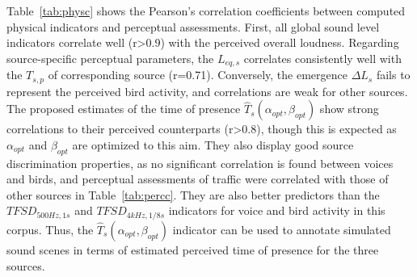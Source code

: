 \documentclass[twocolumn]{article}
\begin{document}
Table~\ref{tab:physc} shows the Pearson's correlation coefficients between computed physical indicators and perceptual assessments. First, all global sound level indicators correlate well (r>0.9) with the perceived overall loudness. Regarding source-specific perceptual parameters, the $L_{eq, s}$ correlates consistently well with the $T_{s, p}$ of corresponding source (r=0.71). Conversely, the emergence $\Delta L_s$ fails to represent the perceived bird activity, and correlations are weak for other sources. The proposed estimates of the time of presence $\hat T_s(\alpha_{opt}, \beta_{opt})$ show strong correlations to their perceived counterparts (r>0.8), though this is expected as $\alpha_{opt}$ and $\beta_{opt}$ are optimized to this aim. They also display good source discrimination properties, as no significant correlation is found between voices and birds, and perceptual assessments of traffic were correlated with those of other sources in Table~\ref{tab:percc}. They are also better predictors than the $TFSD_{500Hz, 1s}$ and $TFSD_{4kHz, 1/8s}$ indicators for voice and bird activity in this corpus. Thus, the $\hat T_s(\alpha_{opt}, \beta_{opt})$ indicator can be used to annotate simulated sound scenes in terms of estimated perceived time of presence for the three sources.
\end{document}

